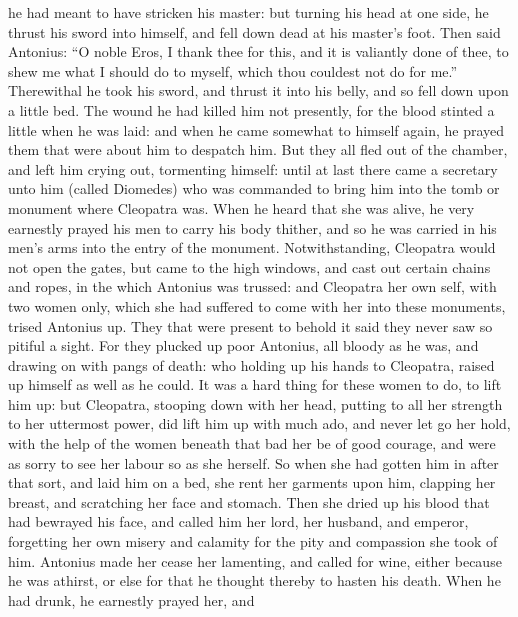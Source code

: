 \documentclass{book}
\begin{document}
he had meant to have stricken his master: but turning his head at
one side, he thrust his sword into himself, and fell down dead at
his master's foot. 
Then said Antonius: ``O noble Eros, I thank thee for this, and it is
valiantly done of thee, to shew me what I should do to myself, which
thou couldest not do for me.'' Therewithal  he took his sword,
and thrust it into his belly, and so fell down upon a little bed.
The wound he had killed him not presently, for the blood stinted a
little when he was laid: and when he came somewhat to himself again,
he prayed them that were about him to despatch him. But they all fled
out of the chamber, and left him crying out, tormenting himself: until
at last there came a secretary unto him (called Diomedes) who was
commanded to bring him into the tomb or monument where Cleopatra was.
When he heard that she was alive, he very earnestly prayed his men
to carry his body thither, and so he was carried  in his men's arms into the entry of
the monument. Notwithstanding, Cleopatra would not open the gates,
but came to the high windows, and cast out certain chains and ropes,
in the which Antonius was trussed: and Cleopatra her own self, with
two women only, which she had suffered to come with her into these
monuments, trised Antonius up. They that were present to behold it
said they
never saw so pitiful a sight. For they plucked up poor Antonius, all
bloody as he was, and drawing on with pangs of death: who holding up
his hands to Cleopatra, raised up himself as well as he could. It was
a hard thing for these women to do, to lift him up: but Cleopatra,
stooping down with her head, putting to all her strength to her
uttermost power, did lift him up with much ado, and never let go her
hold, with the help of the women beneath that bad her be of good
courage, and were as sorry to see her labour so as she herself. So
when she had gotten him in after that sort, and laid him on a bed, she
rent her garments upon him, clapping her breast, and scratching her
face and stomach. Then she dried up his blood that had bewrayed his
face, and called him her lord, her husband, and emperor, forgetting
her own misery and calamity for the pity and compassion she took of
him. Antonius made her cease her lamenting, and called for wine,
either because he was athirst, or else for that he thought thereby
to hasten his death. When he had drunk, he earnestly prayed her, and
\end{document}
